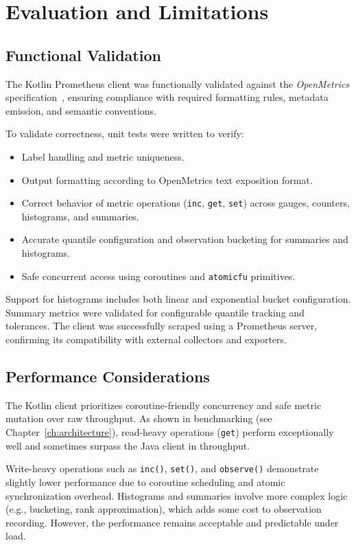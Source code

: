 \chapter{Evaluation and Limitations} \label{cap:evaluation}

\section{Functional Validation}

The Kotlin Prometheus client was functionally validated against the \textit{OpenMetrics} specification~\cite{openmetrics-spec}, ensuring compliance with required formatting rules, metadata emission, and semantic conventions.

To validate correctness, unit tests were written to verify:
\begin{itemize}
  \item Label handling and metric uniqueness.
  \item Output formatting according to OpenMetrics text exposition format.
  \item Correct behavior of metric operations (\texttt{inc}, \texttt{get}, \texttt{set}) across gauges, counters, histograms, and summaries.
  \item Accurate quantile configuration and observation bucketing for summaries and histograms.
  \item Safe concurrent access using coroutines and \texttt{atomicfu} primitives.
\end{itemize}

Support for histograms includes both linear and exponential bucket configuration. Summary metrics were validated for configurable quantile tracking and tolerances. The client was successfully scraped using a Prometheus server, confirming its compatibility with external collectors and exporters.

\section{Performance Considerations}

The Kotlin client prioritizes coroutine-friendly concurrency and safe metric mutation over raw throughput. As shown in benchmarking (see Chapter~\ref{ch:architecture}), read-heavy operations (\texttt{get}) perform exceptionally well and sometimes surpass the Java client in throughput.

Write-heavy operations such as \texttt{inc()}, \texttt{set()}, and \texttt{observe()} demonstrate slightly lower performance due to coroutine scheduling and atomic synchronization overhead. Histograms and summaries involve more complex logic (e.g., bucketing, rank approximation), which adds some cost to observation recording. However, the performance remains acceptable and predictable under load.

